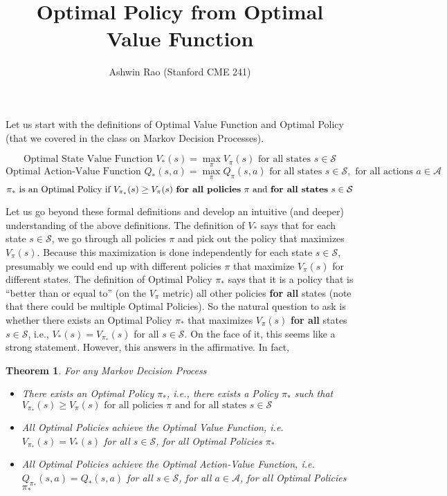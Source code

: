 \documentclass[12pt]{amsart}
\title{Optimal Policy from Optimal Value Function}
\author{Ashwin Rao (Stanford CME 241)}
\date{} %
\newtheorem{theorem}{Theorem}
\begin{document}
\maketitle
Let us start with the definitions of Optimal Value Function and Optimal Policy (that we covered in the class on Markov Decision Processes).

$$\mbox{Optimal State Value Function } V_*(s) = \max_{\pi} V_{\pi}(s) \mbox{ for all states } s \in \mathcal{S}$$
$$\mbox{Optimal Action-Value Function } Q_*(s,a) = \max_{\pi} Q_{\pi}(s,a) \mbox{ for all states } s \in \mathcal{S}, \mbox{ for all actions } a \in \mathcal{A}$$
$$\pi_* \mbox{ is an Optimal Policy if } V_{\pi_*}(s) \geq V_{\pi}(s) \mbox{ {\bf for all policies} } \pi \mbox{ and {\bf for all states} } s \in \mathcal{S}$$ 

Let us go beyond these formal definitions and develop an intuitive (and deeper) understanding of the above definitions. The definition of $V_*$ says that for each state $s \in \mathcal{S}$, we go through all policies $\pi$ and pick out the policy that maximizes $V_{\pi}(s)$. Because this maximization is done independently for each state $s \in \mathcal{S}$, presumably we could end up with different policies $\pi$ that maximize $V_{\pi}(s)$ for different states. The definition of 
Optimal Policy $\pi_*$ says that it is a policy that is ``better than or equal to'' (on the $V_{\pi}$ metric) all other policies {\bf for all} states (note that there could be multiple Optimal Policies). So the natural question to ask is whether there exists an Optimal Policy $\pi_*$ that maximizes $V_{\pi}(s)$  {\bf for all} states $s \in \mathcal{S}$, i.e., $V_*(s) = V_{\pi_*}(s)$ for all $s \in \mathcal{S}$. On the face of it, this seems like a strong statement. However, this answers in the affirmative. In fact,

\begin{theorem}
For any Markov Decision Process
\begin{itemize}
\item There exists an Optimal Policy $\pi_*$, i.e., there exists a Policy $\pi_*$ such that $V_{\pi_*}(s) \geq V_{\pi}(s) \mbox{ for all policies  } \pi \mbox{ and for all states } s \in \mathcal{S}$
\item All Optimal Policies achieve the Optimal Value Function, i.e. $V_{\pi_*}(s) = V_*(s)$ for all $s \in \mathcal{S}$, for all Optimal Policies $\pi_*$
\item All Optimal Policies achieve the Optimal Action-Value Function, i.e. $Q_{\pi_*}(s,a) = Q_*(s,a)$ for all $s \in \mathcal{S}$, for all $a \in \mathcal{A}$, for all Optimal Policies $\pi_*$
\end{itemize}
\end{theorem}
\end{document}

